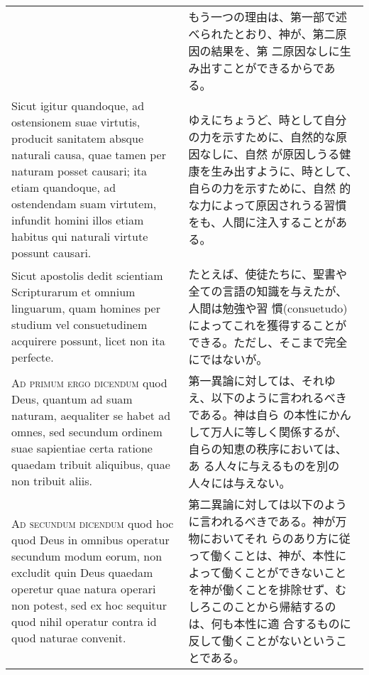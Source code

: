 \documentclass[10pt]{jsarticle} %
\begin{document}
\begin{longtable}{p{21em}p{21em}}
&

もう一つの理由は、第一部で述べられたとおり、神が、第二原因の結果を、第
二原因なしに生み出すことができるからである。

\\

Sicut igitur quandoque, ad ostensionem suae virtutis, producit
sanitatem absque naturali causa, quae tamen per naturam posset
causari; ita etiam quandoque, ad ostendendam suam virtutem, infundit
homini illos etiam habitus qui naturali virtute possunt causari.


&

ゆえにちょうど、時として自分の力を示すために、自然的な原因なしに、自然
が原因しうる健康を生み出すように、時として、自らの力を示すために、自然
的な力によって原因されうる習慣をも、人間に注入することがある。

\\

Sicut apostolis dedit scientiam Scripturarum et omnium linguarum, quam
homines per studium vel consuetudinem acquirere possunt, licet non ita
perfecte.

&

たとえば、使徒たちに、聖書や全ての言語の知識を与えたが、人間は勉強や習
慣(consuetudo)によってこれを獲得することができる。ただし、そこまで完全
にではないが。

\\



{\scshape Ad primum ergo dicendum} quod Deus, quantum ad suam naturam,
aequaliter se habet ad omnes, sed secundum ordinem suae sapientiae
certa ratione quaedam tribuit aliquibus, quae non tribuit aliis.

&

第一異論に対しては、それゆえ、以下のように言われるべきである。神は自ら
の本性にかんして万人に等しく関係するが、自らの知恵の秩序においては、あ
る人々に与えるものを別の人々には与えない。

\\




{\scshape Ad secundum dicendum} quod hoc quod Deus in omnibus operatur
secundum modum eorum, non excludit quin Deus quaedam operetur quae
natura operari non potest, sed ex hoc sequitur quod nihil operatur
contra id quod naturae convenit.


&

第二異論に対しては以下のように言われるべきである。神が万物においてそれ
らのあり方に従って働くことは、神が、本性によって働くことができないこと
を神が働くことを排除せず、むしろこのことから帰結するのは、何も本性に適
合するものに反して働くことがないということである。



\end{longtable}
\end{document}
